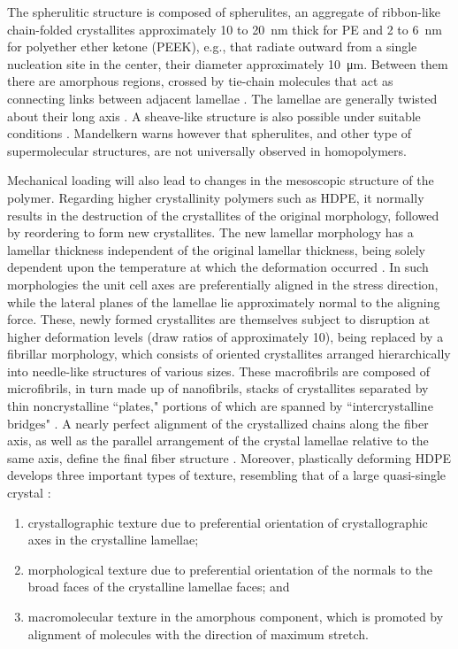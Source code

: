 The spherulitic structure is composed of spherulites, an aggregate of ribbon-like chain-folded crystallites approximately 10 to \SI{20}{\nano\meter} thick for PE and 2 to \SI{6}{\nano\meter} for polyether ether ketone (PEEK), e.g., that radiate outward from a single nucleation site in the center, their diameter approximately \SI{10}{\micro\meter}.
Between them there are amorphous regions, crossed by tie-chain molecules that act as connecting links between adjacent lamellae \citep{callister2014materials, khouryMorphologyCrystallineSynthetic1976, pouriayevaliConstitutiveDescriptionRatesensitive2013, gsellEvolutionMicrostructureSemicrystalline1994}.
The lamellae are generally twisted about their long axis \citep{patlazhanStructuralMechanicsSemicrystalline2012}.
A sheave-like structure is also possible under suitable conditions \citep{peacockHandbookPolyethyleneStructures2014}.
Mandelkern \citep{mandelkernCrystallinePolymerReminiscences2006} warns however that spherulites, and other type of supermolecular structures, are not universally observed in homopolymers.

Mechanical loading will also lead to changes in the mesoscopic structure of the polymer.
Regarding higher crystallinity polymers such as HDPE, it normally results in the destruction of the crystallites of the original morphology, followed by reordering to form new crystallites.
The new lamellar morphology has a lamellar thickness independent of the original lamellar thickness, being solely dependent upon the temperature at which the deformation occurred .
In such morphologies the unit cell axes are preferentially aligned in the stress direction, while the lateral planes of the lamellae lie approximately normal to the aligning force.
These, newly formed crystallites are themselves subject to disruption at higher deformation levels (draw ratios of approximately 10), being replaced by a fibrillar morphology, which consists of oriented crystallites arranged hierarchically into needle-like structures of various sizes.
These macrofibrils are composed of microfibrils, in turn made up of nanofibrils, stacks of crystallites separated by thin noncrystalline “plates," portions of which are spanned by “intercrystalline bridges" \citep{peacockHandbookPolyethyleneStructures2014}.
A nearly perfect alignment of the crystallized chains along the fiber axis, as well as the parallel arrangement of the crystal lamellae relative to the same axis, define the final fiber structure \citep{peterlinMolecularModelDrawing1971}.
Moreover, plastically deforming HDPE develops three important types of texture, resembling that of a large quasi-single crystal \citep{argonPhysicsDeformationFracture2013a}:
\begin{enumerate}
	\item crystallographic texture due to preferential orientation of crystallographic axes in the crystalline lamellae;
	\item morphological texture due to preferential orientation of the normals to the broad faces of the crystalline lamellae faces; and
	\item macromolecular texture in the amorphous component, which is promoted by alignment of molecules with the direction of maximum stretch.
\end{enumerate}

